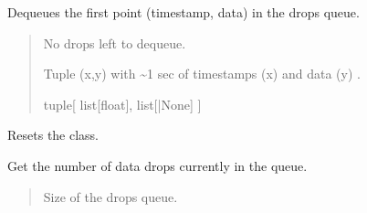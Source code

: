 \documentclass[letterpaper,10pt,english]{sphinxmanual}
\begin{document}
\begin{fulllineitems}
\begin{fulllineitems}
\label{\detokenize{PodApi.Stream:PodApi.Stream.DataBucket.Bucket.DripDrop}}
\pysigstartsignatures
{}
\pysigstopsignatures
\sphinxAtStartPar
Dequeues the first point (timestamp, data) in the drops queue.
\begin{quote}\begin{description}
\sphinxAtStartPar
{} \textendash{} No drops left to dequeue.

\sphinxAtStartPar
Tuple (x,y) with \textasciitilde{}1 sec of                 timestamps (x) and data (y) .

\sphinxAtStartPar
tuple{[} list{[}float{]}, list{[}{\hyperref[\detokenize{PodApi.Packets:PodApi.Packets.Packet.Packet}]{}}|None{]} {]}

\end{description}\end{quote}

\end{fulllineitems}


\begin{fulllineitems}
\label{\detokenize{PodApi.Stream:PodApi.Stream.DataBucket.Bucket.EmptyBucket}}
\pysigstartsignatures
{}
\pysigstopsignatures
\sphinxAtStartPar
Resets the class.

\end{fulllineitems}


\begin{fulllineitems}
\label{\detokenize{PodApi.Stream:PodApi.Stream.DataBucket.Bucket.GetVolumeOfDrops}}
\pysigstartsignatures
{}
\pysigstopsignatures
\sphinxAtStartPar
Get the number of data drops currently in the queue.
\begin{quote}\begin{description}
\sphinxAtStartPar
Size of the drops queue.


\end{description}
\end{quote}
\end{fulllineitems}
\end{fulllineitems}
\end{document}
